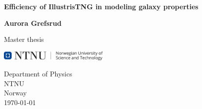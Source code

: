 \begin{titlepage}
   \begin{center}
       \vspace*{1cm}

       \textbf{Efficiency of IllustrisTNG in modeling galaxy properties}
    
       \vspace{1.5cm}

       \textbf{Aurora Grefsrud}

       \vfill
            
       Master thesis\\
            
       \vspace{0.8cm}
     
       \includegraphics[width=0.4\textwidth]{images/ntnu.png}
            
       Department of Physics\\
       NTNU\\
       Norway\\
       \today
            
   \end{center}
\end{titlepage}
